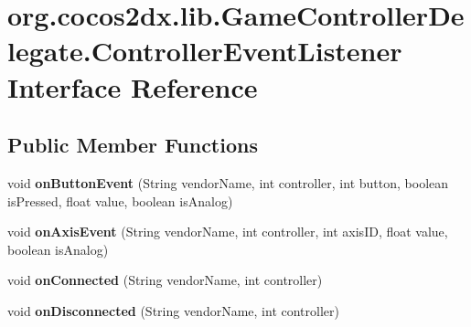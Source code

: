 \hypertarget{interfaceorg_1_1cocos2dx_1_1lib_1_1GameControllerDelegate_1_1ControllerEventListener}{}\section{org.\+cocos2dx.\+lib.\+Game\+Controller\+Delegate.\+Controller\+Event\+Listener Interface Reference}
\label{interfaceorg_1_1cocos2dx_1_1lib_1_1GameControllerDelegate_1_1ControllerEventListener}
\subsection*{Public Member Functions}
\begin{DoxyCompactItemize}
\item 
\mbox{\label{interfaceorg_1_1cocos2dx_1_1lib_1_1GameControllerDelegate_1_1ControllerEventListener_a3dd2fc8fbef0dab24609b0a2b513083d}} 
void {\bfseries on\+Button\+Event} (String vendor\+Name, int controller, int button, boolean is\+Pressed, float value, boolean is\+Analog)
\item 
\mbox{\label{interfaceorg_1_1cocos2dx_1_1lib_1_1GameControllerDelegate_1_1ControllerEventListener_afe2ca5a24f2fe11963d47b818b8234a1}} 
void {\bfseries on\+Axis\+Event} (String vendor\+Name, int controller, int axis\+ID, float value, boolean is\+Analog)
\item 
\mbox{\label{interfaceorg_1_1cocos2dx_1_1lib_1_1GameControllerDelegate_1_1ControllerEventListener_ab2f6d0de13176da4840b1c3fbda536c0}} 
void {\bfseries on\+Connected} (String vendor\+Name, int controller)
\item 
\mbox{\label{interfaceorg_1_1cocos2dx_1_1lib_1_1GameControllerDelegate_1_1ControllerEventListener_a700eef85e297e5d9d7ab9c56c7af5dc1}} 
void {\bfseries on\+Disconnected} (String vendor\+Name, int controller)
\item 
\mbox{\label{interfaceorg_1_1cocos2dx_1_1lib_1_1GameControllerDelegate_1_1ControllerEventListener_a3dd2fc8fbef0dab24609b0a2b513083d}} 

\end{DoxyCompactItemize}
